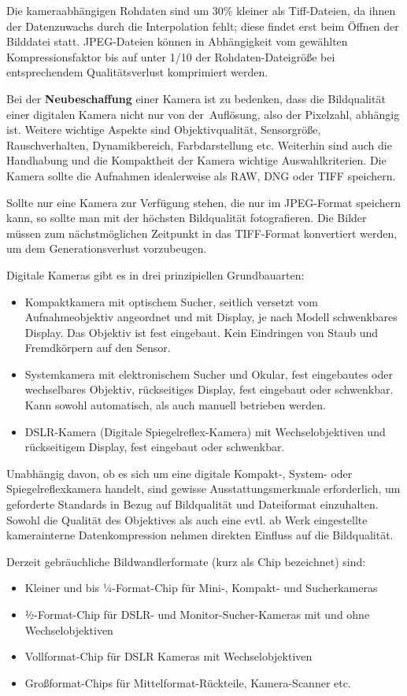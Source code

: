 Die kameraabhängigen Rohdaten sind um 30\% kleiner als Tiff-Dateien, da ihnen der Datenzuwachs durch die Interpolation fehlt; diese findet erst beim Öffnen der Bilddatei statt. JPEG-Dateien können in Abhängigkeit vom gewählten Kompressionsfaktor bis auf unter 1/10 der Rohdaten-Dateigröße bei entsprechendem Qualitätsverlust komprimiert werden.

Bei der {\bfseries Neubeschaffung} einer  Kamera ist zu bedenken, dass die Bildqualität einer digitalen Kamera nicht nur von der Auflösung, also der Pixelzahl, abhängig ist. Weitere wichtige Aspekte sind Objektivqualität, Sensorgröße, Rauschverhalten, Dynamikbereich, Farbdarstellung etc. Weiterhin sind auch die Handhabung und die Kompaktheit der Kamera wichtige Auswahlkriterien. Die Kamera sollte die Aufnahmen idealerweise als RAW, DNG oder TIFF speichern. 

Sollte nur eine Kamera zur Verfügung stehen, die nur im JPEG-Format speichern kann, so sollte man mit der höchsten Bildqualität fotografieren. Die Bilder müssen zum nächstmöglichen Zeitpunkt in das TIFF-Format konvertiert werden, um dem Generationsverlust vorzubeugen.

Digitale Kameras gibt es in drei prinzipiellen Grundbauarten:
\begin{itemize}
	\item Kompaktkamera mit optischem Sucher, seitlich versetzt vom Aufnahmeobjektiv angeordnet und mit Display, je nach Modell schwenkbares Display. Das Objektiv ist fest eingebaut. Kein Eindringen von Staub und Fremdkörpern auf den Sensor. 
	\item Systemkamera mit elektronischem Sucher und Okular, fest eingebautes oder wechselbares Objektiv, rückseitiges Display, fest eingebaut oder schwenkbar. Kann sowohl automatisch, als auch manuell betrieben werden.
	\item DSLR-Kamera (Digitale Spiegelreflex-Kamera) mit Wechselobjektiven und rückseitigem Display, fest eingebaut oder schwenkbar.
\end{itemize}

Unabhängig davon, ob es sich um eine digitale Kompakt-, System- oder Spiegelreflexkamera handelt, sind gewisse Ausstattungsmerkmale erforderlich, um geforderte Standards in Bezug auf Bildqualität und Dateiformat einzuhalten. Sowohl die Qualität des Objektives als auch eine evtl. ab Werk eingestellte kamerainterne Datenkompression nehmen direkten Einfluss auf die Bildqualität.

Derzeit gebräuchliche Bildwandlerformate (kurz als Chip bezeichnet) sind:
\begin{itemize}
	\item Kleiner und bis ¼-Format-Chip für Mini-, Kompakt- und Sucherkameras
	\item ½-Format-Chip für DSLR- und Monitor-Sucher-Kameras mit und ohne Wechselobjektiven
	\item Vollformat-Chip für DSLR Kameras mit Wechselobjektiven
	\item Großformat-Chips für Mittelformat-Rückteile, Kamera-Scanner etc.
\end{itemize}


